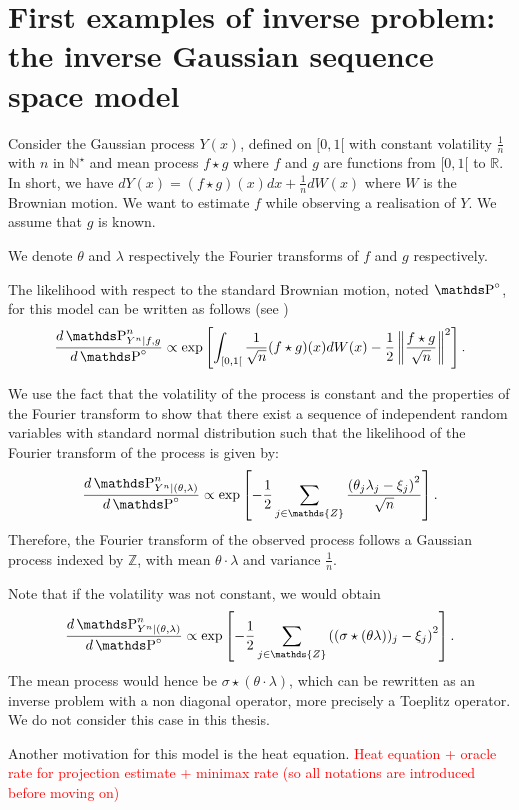 \section{First examples of inverse problem: the inverse Gaussian sequence space model}\label{INTRO_IGSSM}

Consider the Gaussian process $Y(x)$, defined on $[0, 1[$ with constant volatility $\frac{1}{n}$ with $n$ in $\mathds{N}^{\star}$ and mean process $f \star g$ where $f$ and $g$ are functions from $[0, 1[$ to $\mathds{R}$.
In short, we have $dY(x) = (f \star g)(x) dx + \frac{1}{n} dW(x)$ where $W$ is the Brownian motion.
We want to estimate $f$ while observing a realisation of $Y$.
We assume that $g$ is known.



We denote $\theta$ and $\lambda$ respectively the Fourier transforms of $f$ and $g$ respectively.

The likelihood with respect to the standard Brownian motion, noted $\P^{\circ}$, for this model can be written as follows (see )
\[\frac{d \P_{Y^{n} \vert f, g}^{n}}{d \P^{\circ}} \propto \exp\left[\int_{[0, 1[} \frac{1}{\sqrt{n}} (f \star g)(x) dW(x) - \frac{1}{2} \left\Vert \frac{f \star g}{\sqrt{n}} \right\Vert^{2}\right].\]

We use the fact that the volatility of the process is constant and the properties of the Fourier transform to show that there exist a sequence of independent random variables with standard normal distribution such that the likelihood of the Fourier transform of the process is given by:
\[\frac{d\P^{n}_{Y^{n} \vert (\theta, \lambda)}}{d \P^{\circ}} \propto \exp\left[ -\frac{1}{2}\sum\limits_{j \in \mathds{Z}} \frac{\left(\theta_{j} \lambda_{j} - \xi_{j}\right)^{2}}{\sqrt{n}}\right].\]
Therefore, the Fourier transform of the observed process follows a Gaussian process indexed by $\mathds{Z}$, with mean $\theta \cdot \lambda$ and variance $\frac{1}{n}$.

Note that if the volatility was not constant, we would obtain
\[\frac{d\P^{n}_{Y^{n} \vert (\theta, \lambda)}}{d \P^{\circ}} \propto \exp\left[ -\frac{1}{2}\sum\limits_{j \in \mathds{Z}} \left((\sigma \star (\theta \lambda))_{j} - \xi_{j}\right)^{2}\right].\]
The mean process would hence be $\sigma \star (\theta \cdot \lambda)$, which can be rewritten as an inverse problem with a non diagonal operator, more precisely a Toeplitz operator.
We do not consider this case in this thesis.

Another motivation for this model is the heat equation.
\textcolor{red}{Heat equation + oracle rate for projection estimate + minimax rate (so all notations are introduced before moving on)}


